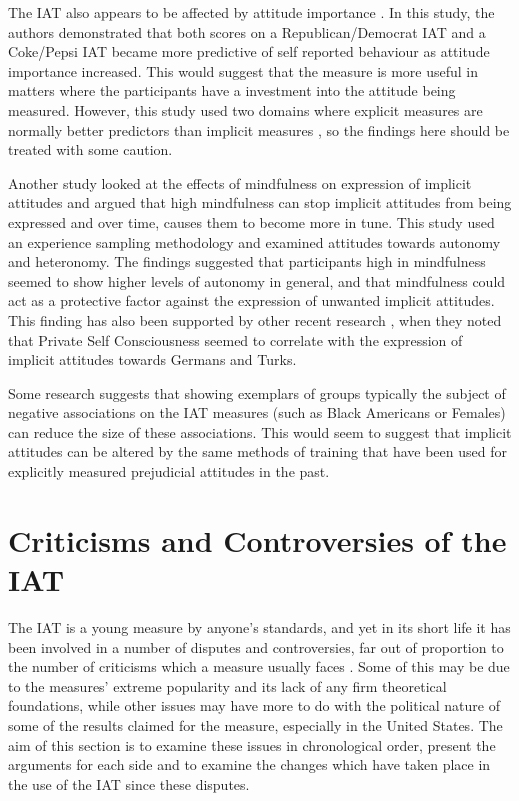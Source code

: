 The IAT also appears to be affected by attitude importance \cite{Karpinski2005}. In this study, the authors demonstrated that both scores on a Republican/Democrat IAT and a Coke/Pepsi IAT became more predictive of self reported behaviour as attitude importance increased. This would suggest that the measure is more useful in matters where the participants have a investment into the attitude being measured. However, this study used two domains where explicit measures are normally better predictors than implicit measures \cite{Nosek2007d}, so the findings here should be treated with some caution. 

Another study \cite{Levesque2007} looked at the effects of mindfulness on expression of implicit attitudes and argued that high mindfulness can stop implicit attitudes from being expressed and over time, causes them to become more in tune. This study used an experience sampling methodology and examined attitudes towards autonomy and heteronomy. The findings suggested that participants high in mindfulness seemed to show higher levels of autonomy in general, and that mindfulness could act as a protective factor against the expression of unwanted implicit attitudes.  This finding has also been supported by other recent research \cite{Gschwendner2006}, when they noted that Private Self Consciousness seemed to correlate with the expression of implicit attitudes towards Germans and Turks. 

Some research \cite{Dasgupta2001} suggests that showing exemplars of groups typically the subject of negative associations on the IAT measures (such as Black Americans or Females) can reduce the size of these associations. This would seem to suggest that implicit attitudes can be altered by the same methods of training that have been used for explicitly measured prejudicial attitudes in the past.

\section{Criticisms and Controversies of the IAT}

The IAT is a young measure by anyone's standards, and yet in its short life it has been involved in a number of disputes and controversies, far out of proportion to the number of criticisms which a measure usually faces \cite{VonHippel2004}. Some of this may be due to the measures' extreme popularity and its lack of any firm theoretical foundations, while other issues may have more to do with the political nature of some of the results claimed for the measure, especially in the United States.  The aim of this section is to examine these issues in chronological order, present the arguments for each side and to examine the changes which have taken place in the use of the IAT since these disputes. 

